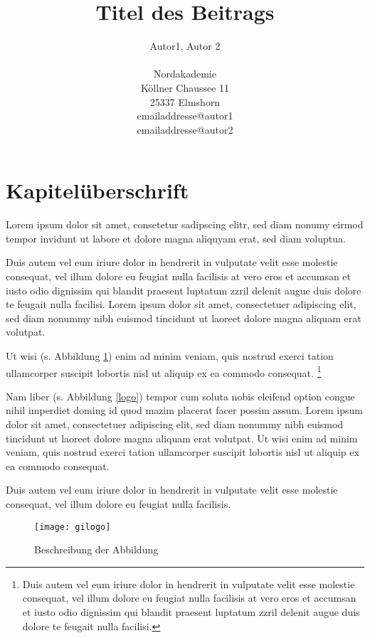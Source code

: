 \documentclass{akdw}
\author{
	Autor1, Autor 2 \\ 
	\\
	Nordakademie\\ 
	Köllner Chaussee 11\\ 
	25337 Elmshorn \\ 
	emailaddresse@autor1 \\
	emailaddresse@autor2
}
\title{Titel des Beitrags}
\begin{document}
\maketitle



\section{Kapitelüberschrift}

Lorem ipsum dolor sit amet, consetetur sadipscing elitr, sed diam nonumy eirmod tempor invidunt ut 
labore et dolore magna aliquyam erat, sed diam voluptua. 

Duis autem vel eum iriure dolor in hendrerit in vulputate velit esse molestie consequat, vel illum 
dolore eu feugiat nulla facilisis at vero eros et accumsan et iusto odio dignissim qui blandit 
praesent luptatum zzril delenit augue duis dolore te feugait nulla facilisi. Lorem ipsum dolor sit 
amet, consectetuer adipiscing elit, sed diam nonummy nibh euismod tincidunt ut laoreet dolore magna 
aliquam erat volutpat. 

Ut wisi (s. Abbildung \ref{logo0}) enim ad minim veniam, quis nostrud exerci tation ullamcorper 
suscipit lobortis nisl ut aliquip ex ea commodo consequat. \footnote{Duis autem vel eum iriure dolor 
in hendrerit in vulputate velit esse molestie consequat, vel illum dolore eu feugiat nulla facilisis 
at vero eros et accumsan et iusto odio dignissim qui blandit praesent luptatum zzril delenit augue 
duis dolore te feugait nulla facilisi.} 

Nam liber (s. Abbildung \ref{logo}) tempor cum soluta nobis eleifend option congue 
nihil imperdiet doming id quod mazim placerat facer possim assum. Lorem ipsum dolor sit amet, 
consectetuer adipiscing elit, sed diam nonummy nibh euismod tincidunt ut laoreet dolore magna 
aliquam erat volutpat. Ut wisi enim ad minim veniam, quis nostrud exerci tation ullamcorper suscipit 
lobortis nisl ut aliquip ex ea commodo consequat. 

Duis autem vel eum iriure dolor in hendrerit in vulputate velit esse molestie consequat, vel illum 
dolore eu feugiat nulla facilisis. 

\begin{figure}[htb]
  \begin{center}
    \texttt{[image: gilogo]}
    \caption{\label{logo0}Beschreibung der Abbildung}
  \end{center}
\end{figure}
\end{document}
